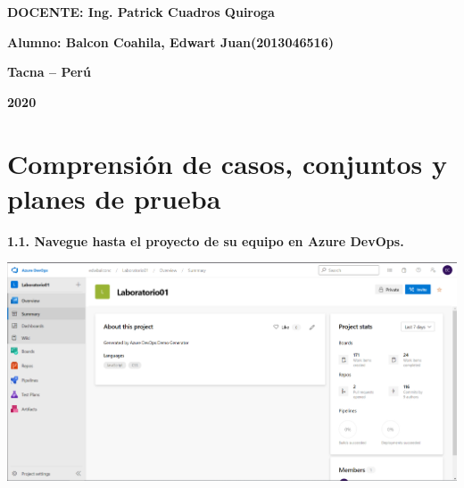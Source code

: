\documentclass{article}
\begin{document}
\begin{titlepage}
\begin{center}
\vspace*{0.3in}
\begin{Large}
\textbf{DOCENTE: Ing. Patrick Cuadros Quiroga} \\
\end{Large}

\vspace*{0.2in}
\vspace*{0.1in}
\begin{large}

\begin{Large}
\textbf{Alumno: Balcon Coahila, Edwart Juan\hfill	(2013046516) } \\
\end{Large}

\vspace*{0.15in}
\begin{Large}
\textbf{Tacna – Perú} \\
\end{Large}

\vspace*{0.05in}
\begin{Large}
\textbf{2020 } \\
\end{Large}

\end{large}
\end{center}

\end{titlepage}


\newpage

\section{
Comprensión de casos, conjuntos y planes de prueba}

\textbf{1.1.
Navegue hasta el proyecto de su equipo en Azure DevOps.}

    \begin{center}
		\includegraphics[width=14cm]{./images/1.1} 
	\end{center}
	
\end{document}
